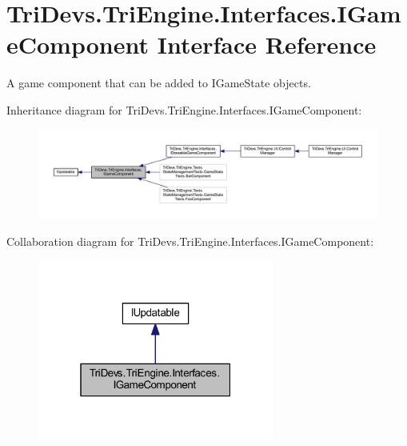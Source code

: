 \hypertarget{interface_tri_devs_1_1_tri_engine_1_1_interfaces_1_1_i_game_component}{\section{Tri\-Devs.\-Tri\-Engine.\-Interfaces.\-I\-Game\-Component Interface Reference}
\label{interface_tri_devs_1_1_tri_engine_1_1_interfaces_1_1_i_game_component}
}


A game component that can be added to I\-Game\-State objects.  




Inheritance diagram for Tri\-Devs.\-Tri\-Engine.\-Interfaces.\-I\-Game\-Component\-:
\nopagebreak
\begin{figure}[H]
\begin{center}
\leavevmode
\includegraphics[width=350pt]{interface_tri_devs_1_1_tri_engine_1_1_interfaces_1_1_i_game_component__inherit__graph}
\end{center}
\end{figure}


Collaboration diagram for Tri\-Devs.\-Tri\-Engine.\-Interfaces.\-I\-Game\-Component\-:
\nopagebreak
\begin{figure}[H]
\begin{center}
\leavevmode
\includegraphics[width=220pt]{interface_tri_devs_1_1_tri_engine_1_1_interfaces_1_1_i_game_component__coll__graph}
\end{center}
\end{figure}
